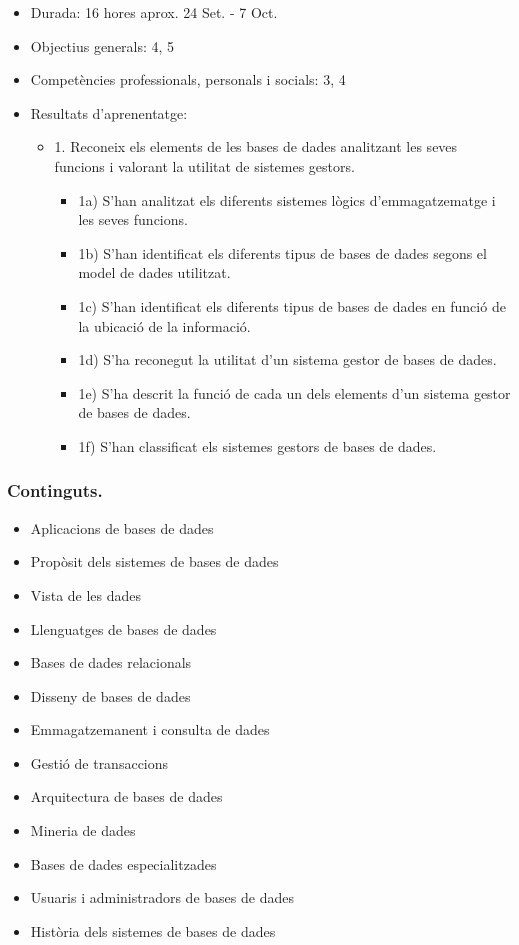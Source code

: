 \documentclass[catalan, a4paper, 12pt, titlepage]{article}
\begin{document}
  \begin{itemize}
	\item Durada: 16 hores aprox. 24 Set. - 7 Oct.
	\item Objectius generals: 4, 5
	\item Competències professionals, personals i socials: 3, 4
	\item Resultats d'aprenentatge: 
		\begin{itemize}
			\item 1. Reconeix els elements de les bases de dades analitzant les seves funcions i valorant la utilitat de sistemes gestors.
				\begin{itemize}
					\item 1a) S'han analitzat els diferents sistemes lògics d'emmagatzematge i les seves funcions.
					\item 1b) S'han identificat els diferents tipus de bases de dades segons el model de dades utilitzat.
					\item 1c) S'han identificat els diferents tipus de bases de dades en funció de la ubicació de la informació.
					\item 1d) S'ha reconegut la utilitat d'un sistema gestor de bases de dades.
					\item 1e) S'ha descrit la funció de cada un dels elements d'un sistema gestor de bases de dades.
					\item 1f) S'han classificat els sistemes gestors de bases de dades.
				\end{itemize}
		\end{itemize}
  \end{itemize}

  
  \subsubsection{Continguts.}

  \begin{itemize}
	  \item Aplicacions de bases de dades
	  \item Propòsit dels sistemes de bases de dades
	  \item Vista de les dades
	  \item Llenguatges de bases de dades
	  \item Bases de dades relacionals
	  \item Disseny de bases de dades
	  \item Emmagatzemanent i consulta de dades
	  \item Gestió de transaccions
	  \item Arquitectura de bases de dades
	  \item Mineria de dades
	  \item Bases de dades especialitzades
	  \item Usuaris i administradors de bases de dades
	  \item Història dels sistemes de bases de dades
  \end{itemize}
  
\end{document}
